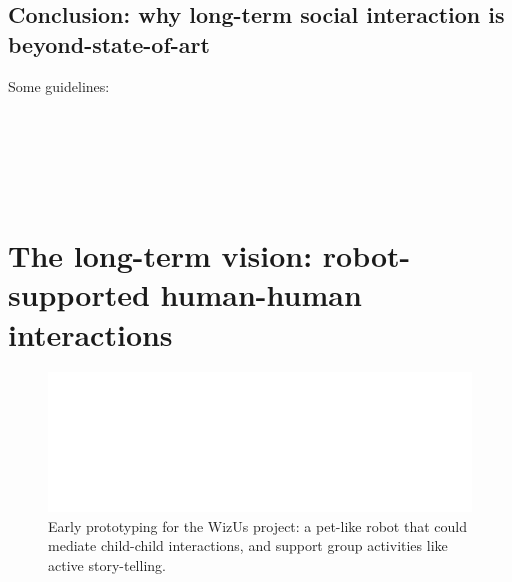 \documentclass[11pt,a4paper]{report}
\newcommand{\project}{WizUs\xspace}
\begin{document}
\subsection{Conclusion: why long-term social interaction is beyond-state-of-art}



Some guidelines:

~\cite{tulli2019great}
~\cite{hoffman2019anki}

~\cite{tonkin2018design}


~\cite{baraka2019extended}










\section{The long-term vision: robot-supported human-human interactions}

\begin{figure}
    \centering
    \includegraphics[width=0.9\linewidth]{figs/wizme+dolls}
    \caption{Early prototyping for the \project project: a pet-like robot that could
    mediate child-child interactions, and support group activities like active story-telling.}
    \label{early-prototype}
\end{figure}



%
%
\end{document}
